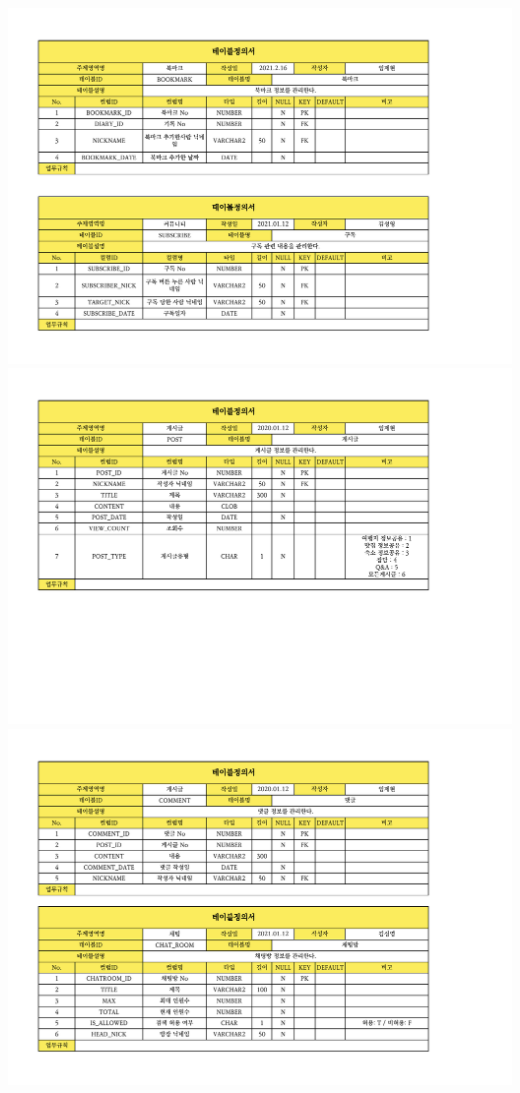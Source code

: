 \begin{landscape}
    {\includegraphics[width=30cm]{./Figure/Design/Display/table/table_07.pdf}} \\
    {\includegraphics[width=30cm]{./Figure/Design/Display/table/table_08.pdf}} \\
    {\includegraphics[width=30cm]{./Figure/Design/Display/table/table_09.pdf}} \\

\end{landscape}
